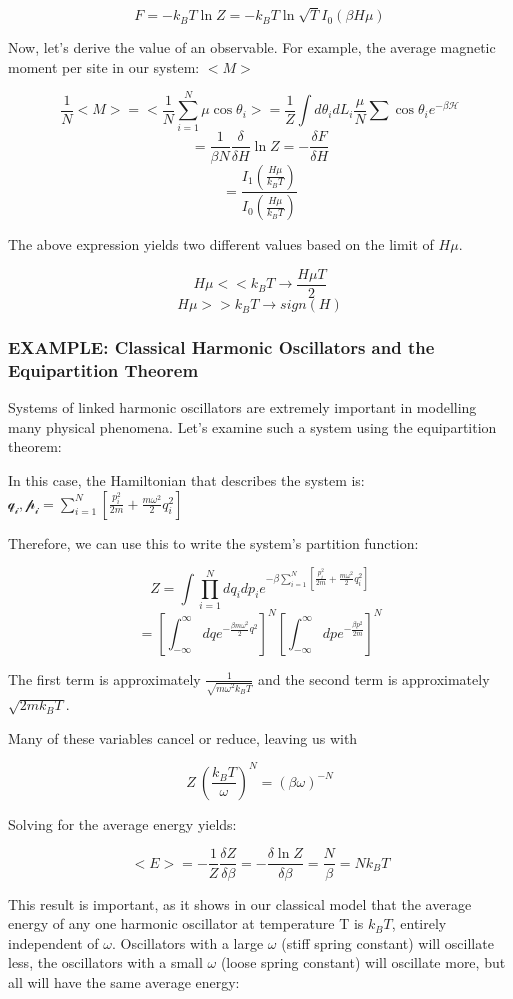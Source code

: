 \documentclass{article}
\newcommand{\pardif}[2]{\frac{\delta#1}{\delta#2}}
\newcommand{\bltz}{k_{B}}
\newcommand{\sumser}[2]{\sum\limits_{#1}^{#2}}
\begin{document}
$$F=-\bltz T\ln{Z}=-\bltz T\ln{\sqrt{T}I_{0}(\beta H\mu)}$$

Now, let's derive the value of an observable.  For example, the average magnetic moment per site in our system: $<M>$

$$\frac{1}{N}<M>=<\frac{1}{N}\sumser{i=1}{N}\mu\cos{\theta_{i}}>=\frac{1}{Z}\int d\theta_{i}dL_{i}\frac{\mu}{N}\sum\cos{\theta_{i}}e^{-\beta\mathcal{H}}$$
$$=\frac{1}{\beta N}\frac{\delta}{\delta H}\ln{Z}=-\pardif{F}{H}$$
$$=\frac{I_{1}(\frac{H\mu}{\bltz T})}{I_{0}(\frac{H\mu}{\bltz T})}$$

The above expression yields two different values based on the limit of $H\mu$.  

$$H\mu<<\bltz T\rightarrow \frac{H\mu T}{2}$$
$$H\mu>>\bltz T\rightarrow sign(H)$$


\subsubsection{EXAMPLE: Classical Harmonic Oscillators and the Equipartition Theorem}

Systems of linked harmonic oscillators are extremely important in modelling many physical phenomena.  Let's examine such a system using the equipartition theorem:

In this case, the Hamiltonian that describes the system is: $\mathcal{q_{i},p_{i}}=\sumser{i=1}{N}[\frac{p_{i}^{2}}{2m}+\frac{m\omega^{2}}{2}q_{i}^{2}]$

Therefore, we can use this to write the system's partition function:

$$Z=\int\prod_{i=1}^{N}dq_{i}dp_{i}e^{-\beta\sumser{i=1}{N}[\frac{p_{i}^{2}}{2m}+\frac{m\omega^{2}}{2}q_{i}^{2}]}$$
$$=[\int_{-\infty}^{\infty}dqe^{-\frac{\beta m\omega^{2}}{2}q^{2}}]^{N}[\int_{-\infty}^{\infty}dpe^{-\frac{\beta p^{2}}{2m}}]^{N}$$

The first term is approximately $\frac{1}{\sqrt{m\omega^{2}\bltz T}}$ and the second term is approximately $\sqrt{2m\bltz T}$.

Many of these variables cancel or reduce, leaving us with

$$Z~(\frac{\bltz T}{\omega})^{N}=(\beta\omega)^{-N}$$

Solving for the average energy yields:

$$<E>=-\frac{1}{Z}\pardif{Z}{\beta}=-\pardif{\ln{Z}}{\beta}=\frac{N}{\beta}=N\bltz T$$

This result is important, as it shows in our classical model that the average energy of any one harmonic oscillator at temperature T is $\bltz T$, entirely independent of $\omega$.  Oscillators with a large $\omega$ (stiff spring constant) will oscillate less, the oscillators with a small $\omega$ (loose spring constant) will oscillate more, but all will have the same average energy:
\end{document}
